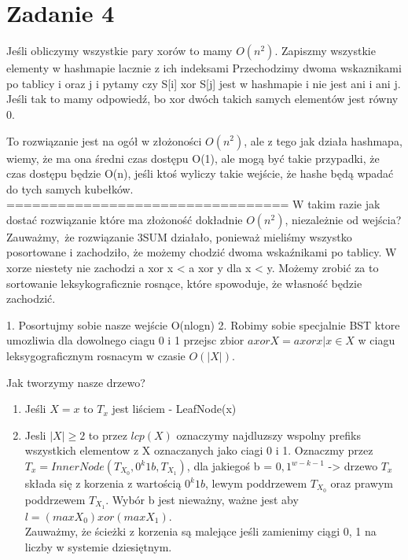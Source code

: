 \documentclass[12pt]{article}
\begin{document}
\section{Zadanie 4}
Jeśli obliczymy wszystkie pary xorów to mamy $O(n^2)$. 
Zapiszmy wszystkie elementy w hashmapie lacznie z ich indeksami
Przechodzimy dwoma wskaznikami po tablicy i oraz j i pytamy czy S[i] xor S[j] jest w hashmapie i nie jest ani i ani j. 
Jeśli tak to mamy odpowiedź, bo xor dwóch takich samych elementów jest równy 0. 

To rozwiązanie jest na ogół w złożoności $O(n^2)$, ale z tego jak działa hashmapa, wiemy, że ma ona średni czas dostępu O(1), ale mogą być takie przypadki, że czas dostępu będzie O(n), jeśli ktoś wyliczy takie wejście, że hashe będą wpadać do tych samych kubełków.
=================================
W takim razie jak dostać rozwiązanie które ma złożoność dokładnie $O(n^2)$, niezależnie od wejścia?
Zauważmy, że rozwiązanie 3SUM działało, ponieważ mieliśmy wszystko posortowane i zachodziło, że możemy chodzić dwoma wskaźnikami po tablicy. W xorze niestety nie zachodzi a xor x < a xor y dla x < y. Możemy zrobić za to sortowanie leksykograficznie rosnące, które spowoduje, że własność będzie zachodzić. 



1. Posortujmy sobie nasze wejście O(nlogn)
2. Robimy sobie specjalnie BST ktore umozliwia dla dowolnego ciagu 0 i 1 przejsc zbior $a xor X = {a xor x | x \in X}$ w ciagu leksygograficznym rosnacym w czasie $O(|X|)$.

Jak tworzymy nasze drzewo?
\begin{enumerate}
    \item Jeśli $X = {x}$ to $T_x$ jest liściem - LeafNode(x) 
    \item Jesli $|X| \geq 2$ to przez $lcp(X)$ oznaczymy najdluzszy wspolny prefiks wszystkich elementow z X oznaczanych jako ciagi 0 i 1. Oznaczmy przez $T_x = InnerNode(T_{X_0}, 0^k1b, T_{X_1})$, dla jakiegoś b = ${0, 1}^{w-k-1}$ -> drzewo $T_x$ składa się z korzenia z wartością $0^k1b$, lewym poddrzewem $T_{X_0}$ oraz prawym poddrzewem $T_{X_1}$. Wybór b jest nieważny, ważne jest aby $l = (max X_0) xor (max X_1)$. \\ Zauważmy, że ścieżki z korzenia są malejące jeśli zamienimy ciągi 0, 1 na liczby w systemie dziesiętnym. 
\end{enumerate}
\end{document}
